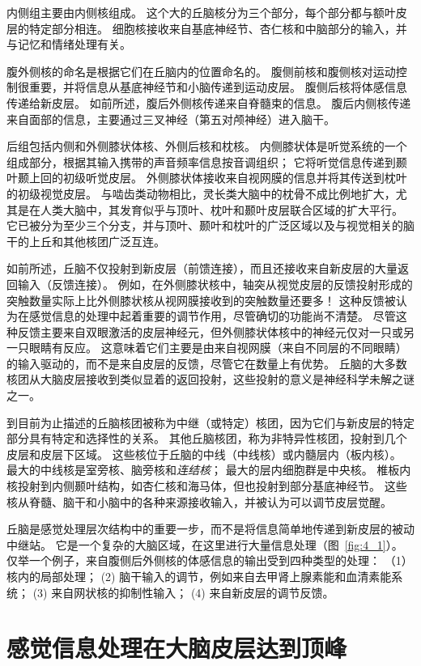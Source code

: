 内侧组主要由内侧核组成。 
这个大的丘脑核分为三个部分，每个部分都与额叶皮层的特定部分相连。 
细胞核接收来自基底神经节、杏仁核和中脑部分的输入，并与记忆和情绪处理有关。


腹外侧核的命名是根据它们在丘脑内的位置命名的。 
腹侧前核和腹侧核对运动控制很重要，并将信息从基底神经节和小脑传递到运动皮层。
腹侧后核将体感信息传递给新皮层。
如前所述，腹后外侧核传递来自脊髓束的信息。
腹后内侧核传递来自面部的信息，主要通过三叉神经（第五对颅神经）进入脑干。


后组包括内侧和外侧膝状体核、外侧后核和枕核。 
内侧膝状体是听觉系统的一个组成部分，根据其输入携带的声音频率信息按音调组织； 它将听觉信息传递到颞叶颞上回的初级听觉皮层。 
外侧膝状体接收来自视网膜的信息并将其传送到枕叶的初级视觉皮层。 
与啮齿类动物相比，灵长类大脑中的枕骨不成比例地扩大，尤其是在人类大脑中，其发育似乎与顶叶、枕叶和颞叶皮层联合区域的扩大平行。 
它已被分为至少三个分支，并与顶叶、颞叶和枕叶的广泛区域以及与视觉相关的脑干的上丘和其他核团广泛互连。


如前所述，丘脑不仅投射到新皮层（前馈连接），而且还接收来自新皮层的大量返回输入（反馈连接）。 
例如，在外侧膝状核中，轴突从视觉皮层的反馈投射形成的突触数量实际上比外侧膝状核从视网膜接收到的突触数量还要多！ 
这种反馈被认为在感觉信息的处理中起着重要的调节作用，尽管确切的功能尚不清楚。 
尽管这种反馈主要来自双眼激活的皮层神经元，但外侧膝状体核中的神经元仅对一只或另一只眼睛有反应。 
这意味着它们主要是由来自视网膜（来自不同层的不同眼睛）的输入驱动的，而不是来自皮层的反馈，尽管它在数量上有优势。 
丘脑的大多数核团从大脑皮层接收到类似显着的返回投射，这些投射的意义是神经科学未解之谜之一。


到目前为止描述的丘脑核团被称为中继（或特定）核团，因为它们与新皮层的特定部分具有特定和选择性的关系。 其他丘脑核团，称为非特异性核团，投射到几个皮层和皮层下区域。 
这些核位于丘脑的中线（中线核）或内髓层内（板内核）。 
最大的中线核是室旁核、脑旁核和\textit{连结核}；
最大的层内细胞群是中央核。 
椎板内核投射到内侧颞叶结构，如杏仁核和海马体，但也投射到部分基底神经节。
这些核从脊髓、脑干和小脑中的各种来源接收输入，并被认为可以调节皮层觉醒。


丘脑是感觉处理层次结构中的重要一步，而不是将信息简单地传递到新皮层的被动中继站。 
它是一个复杂的大脑区域，在这里进行大量信息处理（图~\ref{fig:4_1}）。 
仅举一个例子，来自腹侧后外侧核的体感信息的输出受到四种类型的处理：
（1）核内的局部处理；
(2) 脑干输入的调节，例如来自去甲肾上腺素能和血清素能系统； 
(3) 来自网状核的抑制性输入； 
(4) 来自新皮层的调节反馈。


\section{感觉信息处理在大脑皮层达到顶峰}

